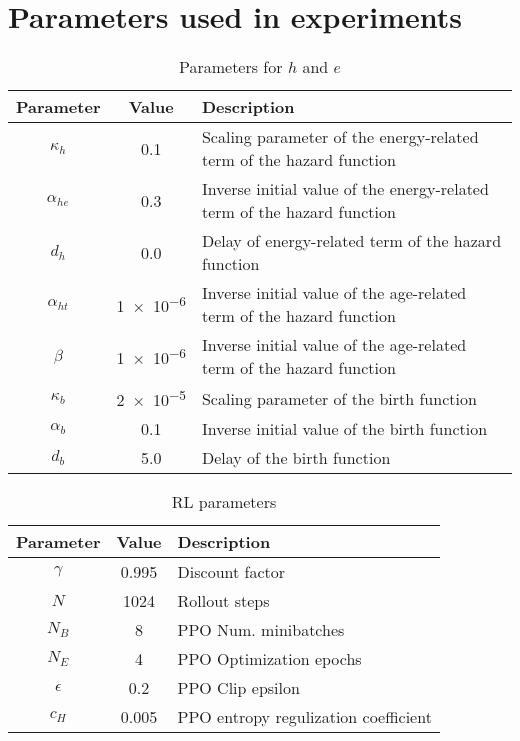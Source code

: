 \section{Parameters used in experiments}\label{ap:a}

\begin{table}[t]
  \centering
  \caption{Parameters for $h$ and $e$}\label{tab:bd-param}
  \begin{tabular}{ccl}
  \toprule
    Parameter & Value & Description \\
    \midrule
    $\kappa_{h}$ & 0.1 & Scaling parameter of the energy-related term of the hazard function \\
    $\alpha_{he}$ & 0.3 & Inverse initial value of the energy-related term of the hazard function \\
    $d_{h}$ & 0.0 & Delay of energy-related term of the hazard function \\
    $\alpha_{ht}$ & \num{1e-6} & Inverse initial value of the age-related term of the hazard function \\
    $\beta$ & \num{1e-6} & Inverse initial value of the age-related term of the hazard function \\
    $\kappa_{b}$ & \num{2e-5} & Scaling parameter of the birth function\\
    $\alpha_{b}$ & 0.1 & Inverse initial value of the birth function \\
    $d_{b}$ & 5.0 & Delay of the birth function \\
    \bottomrule
  \end{tabular}
\end{table}

\begin{table}[t]
  \centering
  \caption{RL parameters}\label{tab:rl-param}
  \begin{tabular}{ccl}
  \toprule
    Parameter & Value & Description \\
    \midrule
    $\gamma$ & 0.995 & Discount factor \\
    $N$ & 1024 & Rollout steps \\
    $N_{B}$ & 8 & PPO Num. minibatches \\
    $N_{E}$ & 4 & PPO Optimization epochs \\
    $\epsilon$ & 0.2 & PPO Clip epsilon \\
    $c_{H}$ & 0.005 & PPO entropy regulization coefficient \\
  \end{tabular}
\end{table}
